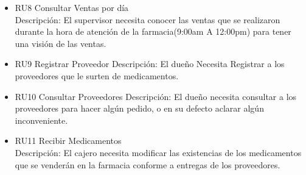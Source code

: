 \begin{itemize}
\item RU8 Consultar Ventas por día\\
Descripción: El supervisor necesita conocer las ventas que se realizaron durante la hora de atención de la farmacia(9:00am A 12:00pm) para tener una visión de las ventas.\\

\item RU9 Registrar Proveedor
Descripción: El dueño Necesita Registrar a los proveedores que le surten de medicamentos.\\

\item RU10 Consultar Proveedores
Descripción: El dueño necesita consultar a los proveedores para hacer algún pedido,
o en su defecto aclarar algún inconveniente.\\

\item RU11 Recibir Medicamentos\\
Descripción: El cajero necesita modificar las existencias de los medicamentos que se venderán en la farmacia conforme a entregas de los proveedores.\\
\end{itemize}
\newpage
